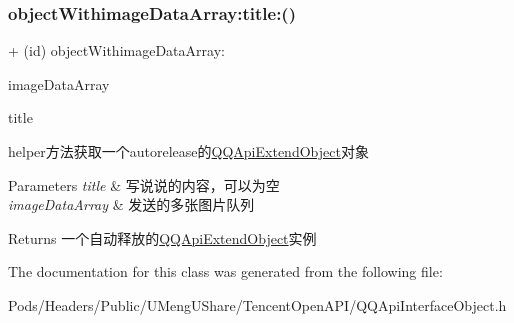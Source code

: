 \subsubsection{\texorpdfstring{object\+Withimage\+Data\+Array\+:title\+:()}{objectWithimageDataArray:title:()}\hspace{0.1cm}{\footnotesize\ttfamily [2/2]}}
{\footnotesize\ttfamily + (id) object\+Withimage\+Data\+Array\+: \begin{DoxyParamCaption}\item[{(N\+S\+Array $\ast$)}]{image\+Data\+Array }\item[{title:(N\+S\+String $\ast$)}]{title }\end{DoxyParamCaption}}

helper方法获取一个autorelease的{\ttfamily \mbox{\hyperlink{interface_q_q_api_extend_object}{Q\+Q\+Api\+Extend\+Object}}}对象 
\begin{DoxyParams}{Parameters}
{\em title} & 写说说的内容，可以为空 \\
\hline
{\em image\+Data\+Array} & 发送的多张图片队列 \\
\hline
\end{DoxyParams}
\begin{DoxyReturn}{Returns}
一个自动释放的{\ttfamily \mbox{\hyperlink{interface_q_q_api_extend_object}{Q\+Q\+Api\+Extend\+Object}}}实例 
\end{DoxyReturn}


The documentation for this class was generated from the following file\+:\begin{DoxyCompactItemize}
\item 
Pods/\+Headers/\+Public/\+U\+Meng\+U\+Share/\+Tencent\+Open\+A\+P\+I/Q\+Q\+Api\+Interface\+Object.\+h\end{DoxyCompactItemize}
